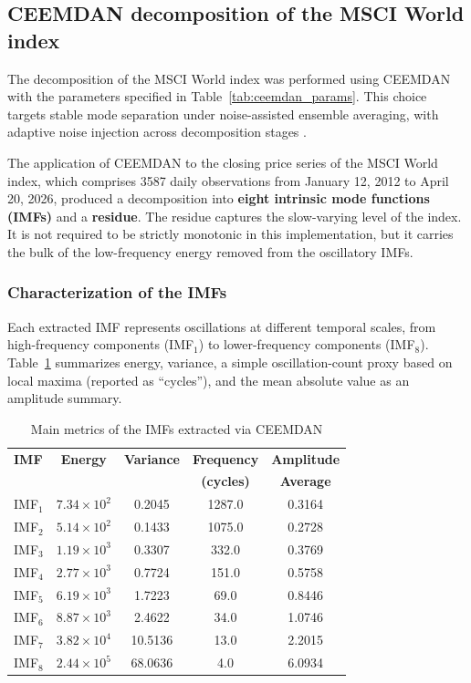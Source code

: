 \documentclass[11pt,a4paper]{article}
\begin{document}
\FloatBarrier

\subsection{CEEMDAN decomposition of the MSCI World index}
\label{sec:ceemdan_msci}

The decomposition of the MSCI World index was performed using CEEMDAN with the parameters specified in Table~\ref{tab:ceemdan_params}. This choice targets stable mode separation under noise-assisted ensemble averaging, with adaptive noise injection across decomposition stages \citep{torres2011complete}.

The application of CEEMDAN to the closing price series of the MSCI World index, which comprises 3587 daily observations from January 12, 2012 to April 20, 2026, produced a decomposition into \textbf{eight intrinsic mode functions (IMFs)} and a \textbf{residue}. The residue captures the slow-varying level of the index. It is not required to be strictly monotonic in this implementation, but it carries the bulk of the low-frequency energy removed from the oscillatory IMFs.

\subsubsection{Characterization of the IMFs}

Each extracted IMF represents oscillations at different temporal scales, from high-frequency components (IMF$_1$) to lower-frequency components (IMF$_8$). Table~\ref{tab:imf_metrics} summarizes energy, variance, a simple oscillation-count proxy based on local maxima (reported as ``cycles''), and the mean absolute value as an amplitude summary.

\begin{table}[h]
\centering
\caption{Main metrics of the IMFs extracted via CEEMDAN}
\label{tab:imf_metrics}
\small
\begin{tabular}{lcccc}
\toprule
\textbf{IMF} & \textbf{Energy} & \textbf{Variance} & \textbf{Frequency} & \textbf{Amplitude} \\
 & & & \textbf{(cycles)} & \textbf{Average} \\
\midrule
IMF$_1$ & $7.34 \times 10^2$ & 0.2045 & 1287.0 & 0.3164 \\
IMF$_2$ & $5.14 \times 10^2$ & 0.1433 & 1075.0 & 0.2728 \\
IMF$_3$ & $1.19 \times 10^3$ & 0.3307 & 332.0 & 0.3769 \\
IMF$_4$ & $2.77 \times 10^3$ & 0.7724 & 151.0 & 0.5758 \\
IMF$_5$ & $6.19 \times 10^3$ & 1.7223 & 69.0 & 0.8446 \\
IMF$_6$ & $8.87 \times 10^3$ & 2.4622 & 34.0 & 1.0746 \\
IMF$_7$ & $3.82 \times 10^4$ & 10.5136 & 13.0 & 2.2015 \\
IMF$_8$ & $2.44 \times 10^5$ & 68.0636 & 4.0 & 6.0934 \\
\bottomrule
\end{tabular}
\end{table}
\end{document}
